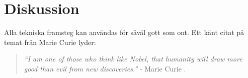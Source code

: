 \documentclass[12pt, a4paper]{article}
\begin{document}

%
%
%
%


%
%



\section{Diskussion}

Alla tekniska framsteg kan användas för såväl gott som ont. Ett känt citat på
temat från Marie Curie lyder:

\begin{quote}
	\textit{``I am one of those who think like Nobel, that humanity will draw
	more good than evil from new discoveries.''} - Marie Curie
	\cite{curie_quote}.
\end{quote}
\end{document}
